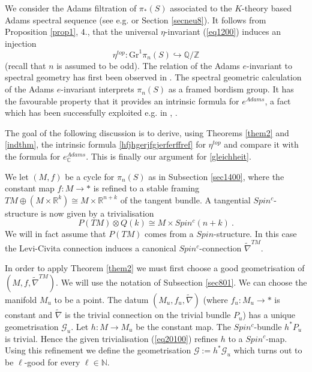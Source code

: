 \documentclass[12pt]{article}
\newcommand{\Gr}{\mathrm{Gr}}
\newcommand{\cG}{{\mathcal{G}}}
\newcommand{\nat}{{\mathbb{N}}}
\newcommand{\Z}{{\mathbb{Z}}}
\newcommand{\Q}{{\mathbb{Q}}}
\newcommand{\R}{{\mathbb{R}}}
\newcommand{\C}{{\mathbb{C}}}
\begin{document}
We consider the Adams filtration
  of  $\pi_{*}(S)$ associated to the $K$-theory based Adams spectral sequence (see e.g. \cite{MR1324104} or Section \ref{secneu8}). It follows from Proposition \ref{prop1}, $4.$, that  the universal $\eta$-invariant  (\ref{eq1200}) induces an injection
$$\eta^{top}:\Gr^{1}\pi_{n}(S) \hookrightarrow \Q/\Z$$ (recall that $n$ is assumed to be odd).
The relation of the Adams $e$-invariant to spectral geometry  has first been observed in \cite{MR0397799}. The spectral geometric calculation of the Adams $e$-invariant interprets $\pi_{n}(S)$ as a framed bordism group.
 It has the favourable
property that it provides an intrinsic formula for $e^{Adams}$, a fact which  has been successfully exploited e.g. in \cite{MR762355}, \cite{MR687857}. 

The goal of the following discussion is to derive, using Theorems \ref{them2} and \ref{indthm},   the   intrinsic formula \eqref{hfjhgerjfgjerferffref} for $\eta^{top}$ and compare it with the formula \cite[Thm 4.14]{MR0397798} for
$e^{Adams}_{\C}$.
This  is finally our argument for \eqref{gleichheit}.


We let $(M,f)$ be a cycle for $\pi_{n}(S)$ as in Subsection \ref{sec1400}, where the constant map $f:M\to *$  is refined to   a stable framing  $TM\oplus (M\times \R^{k})\cong M\times \R^{n+k}$  of the tangent bundle. 
 A tangential   $Spin^{c}$-structure is now given by
a trivialisation \begin{equation}\label{eq20100}P(TM)\otimes Q(k)\cong M\times Spin^{c}(n+k)\ .\end{equation} We will  in fact assume that $P(TM)$ comes from a $Spin$-structure. In this case the Levi-Civita connection induces a canonical $Spin^{c}$-connection
$\tilde \nabla^{TM}$.

In order to apply  Theorem \ref{them2}
we must first choose a good geometrisation of $(M,f,\tilde\nabla^{TM})$. We will use the notation of 
 Subsection \ref{sec801}.  We can  choose the  manifold $M_{u}$ to be a point. The datum $(M_{u},f_{u},\tilde \nabla)$ (where $f_{u}:M_{u}\to *$ is constant and $\tilde \nabla$ is the trivial connection on the trivial bundle $P_{u}$) has  a unique geometrisation $\cG_{u}$. Let $h:M\to M_{u}$ be the constant map.  The $Spin^{c}$-bundle $h^{*}P_{u}$ is trivial. Hence the given trivialisation (\ref{eq20100}) 
 refines  $h$ to a $Spin^{c}$-map.  Using this refinement
we define
the geometrisation $\cG:=h^{*}\cG_{u}$ which turns out to be $\ell$-good for every $\ell\in \nat$. 
\end{document}
